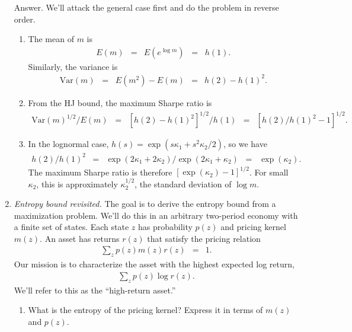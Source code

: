 \documentclass[11pt]{article}
\begin{document}
\begin{enumerate}
Answer. 
We'll attack the general case first and
do the problem in reverse order.
\begin{enumerate}
\item The mean of $m$ is
\begin{eqnarray*}
    E(m) &=& E (e^{\log m}) \;\;=\;\; h(1) .
\end{eqnarray*}
Similarly, the variance is
\begin{eqnarray*}
    \mbox{Var}(m) \;\;=\;\; E(m^2) - E(m)  &=& h(2) - h(1)^2 .
\end{eqnarray*}
\item From the HJ bound, the maximum Sharpe ratio is
\begin{eqnarray*}
    \mbox{Var}(m)^{1/2}/E(m) \;\;=\;\; [h(2) - h(1)^2]^{1/2} / h(1)
        &=& [h(2)/h(1)^2 - 1]^{1/2}  .
\end{eqnarray*}

\item In the lognormal case,
$ h(s) = \exp(s \kappa_1 + s^2 \kappa_2 /2 )$,
so we have
\begin{eqnarray*}
    h(2)/h(1)^2 &=& \exp(2 \kappa_1 + 2 \kappa_2) / \exp(2 \kappa_1 + \kappa_2)
            \;\;=\;\; \exp(\kappa_2) .
\end{eqnarray*}
The maximum Sharpe ratio is therefore $ [\exp(\kappa_2) - 1]^{1/2} $.
For small $\kappa_2$, this is approximately $\kappa_2^{1/2} $,
the standard deviation of $\log m$.
\end{enumerate}


\item {\it Entropy bound revisited.\/}
The goal is to derive the entropy bound from a maximization problem.
We'll do this in an arbitrary two-period economy with a finite set of states.
Each state $z$ has probability $p(z)$
and pricing kernel $m(z)$.
An asset has returns $r(z)$ that satisfy the pricing relation
\begin{eqnarray}
    \sum_z p(z) m(z) r(z) &=& 1.
    \label{eq:pricing-relation}
\end{eqnarray}
Our mission is to characterize the asset with the highest expected log return,
\begin{eqnarray*}
    \sum_z p(z) \log r(z) .
\end{eqnarray*}
We'll refer to this as the ``high-return asset.''
%
\begin{enumerate}
\item What is the entropy of the pricing kernel?
Express it in terms of $m(z)$ and $p(z)$.


\end{enumerate}
\end{enumerate}
\end{document}
